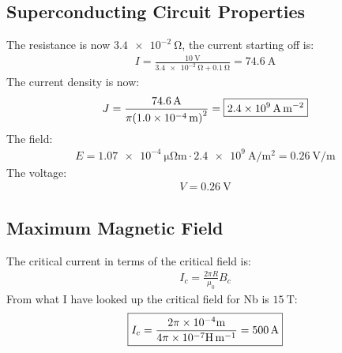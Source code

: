 \documentclass[12pt]{article}
\begin{document}
\subsection{Superconducting Circuit Properties}
The resistance is now $\SI{3.4e-2}{\ohm}$, the current starting off is:
\begin{align*}
  I=\frac{\SI{10}{\V}}{\SI{3.4e-2}{\ohm}+\SI{0.1}{\ohm}}=\boxed{\SI{74.6}{\A}}
\end{align*}
The current density is now:
\begin{align*}
  J=\frac{\SI{74.6}{\A}}{\pi\qty(\SI{1.0e-4}{\m})^2}=
  \boxed{\SI{2.4e9}{\A\per\square\m}}
\end{align*}
The field:
\begin{align*}
  E=\SI{1.07e-4}{\micro\ohm\meter}\cdot\SI{2.4e9}{\A\per\square\meter}=
  \boxed{\SI{0.26}{\V\per\m}}
\end{align*}
The voltage:
\begin{align*}
  \boxed{V=\SI{0.26}{\V}}
\end{align*}
\subsection{Maximum Magnetic Field}
The critical current in terms of the critical field is:
\begin{align*}
  I_c=\frac{2\pi R}{\mu_0}B_c
\end{align*}
From what I have looked up the critical field for Nb is $\SI{15}{\tesla}$:
\begin{align*}
  \boxed{I_c=\frac{2\pi\times10^{-4}\si{\m}}{4\pi\times10^{-7}\si{\H\per\m}}=
  \SI{500}{\A}}
\end{align*}
\end{document}
